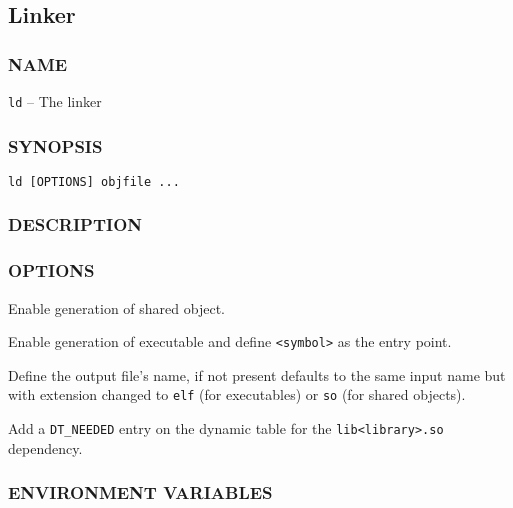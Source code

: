 \newpage
\subsection{Linker}

\subsubsection*{NAME}

\texttt{ld} -- The linker

\subsubsection*{SYNOPSIS}

\begin{lstlisting}[style=bash]
ld [OPTIONS] objfile ...
\end{lstlisting}

\subsubsection*{DESCRIPTION}


\subsubsection*{OPTIONS}

\begin{description}[style=multiline,leftmargin=5cm]
   \item[\texttt{{-}{-}shared}]
   Enable generation of shared object.
   \item[\texttt{-e <symbol>}]
   Enable generation of executable and
   define \texttt{<symbol>} as the entry point.
   \item[\texttt{-o <name>}]
   Define the output file's name,
   if not present defaults to the same input name but with
   extension changed to \texttt{elf} (for executables)
   or \texttt{so} (for shared objects).
   \item[\texttt{-l <library>}]
   Add a \texttt{DT\_NEEDED} entry on the dynamic table for the
   \texttt{lib<library>.so} dependency.
\end{description}

\subsubsection*{ENVIRONMENT VARIABLES}

